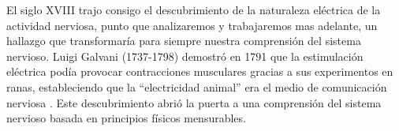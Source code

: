 
El siglo XVIII trajo consigo el descubrimiento de la naturaleza eléctrica de la actividad nerviosa, punto que analizaremos y trabajaremos mas adelante, un hallazgo que transformaría para siempre nuestra comprensión del sistema nervioso. Luigi Galvani (1737-1798) demostró en 1791 que la estimulación eléctrica podía provocar contracciones musculares gracias a sus experimentos en ranas, estableciendo que la ``electricidad animal'' era el medio de comunicación nerviosa \citep{blanco2014historia}. Este descubrimiento abrió la puerta a una comprensión del sistema nervioso basada en principios físicos mensurables.





